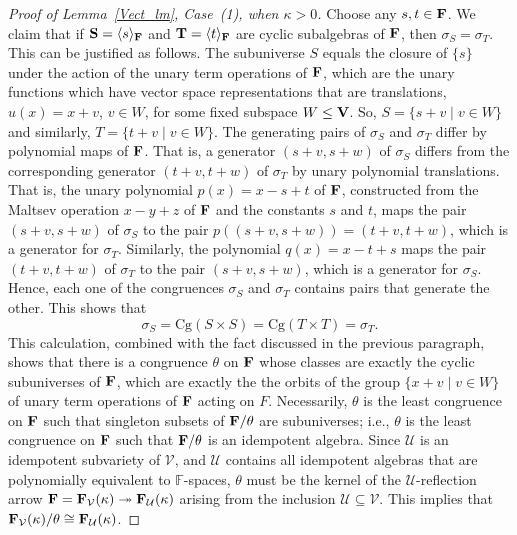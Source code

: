 \documentclass[12pt]{amsart}
\theoremstyle{definition}
\numberwithin{equation}{section}
\newcommand{\m}[1]{{\mathbf{\uppercase{#1}}}}
\newcommand{\cg}{\mathrm{Cg}}
\begin{document}
\begin{proof}[Proof of Lemma~\ref{Vect_lm}, Case~(1), when $\kappa>0$]
Choose any $s, t\in \m f$.
We claim that if
$\m s=\langle s\rangle_{\m f}$ and 
$\m t=\langle t\rangle_{\m f}$ are
cyclic subalgebras of $\m f$, then $\sigma_S=\sigma_T$.
This can be justified as follows.
The subuniverse $S$ equals the closure of $\{s\}$
under the action of the unary term operations
of $\m f$, which are the unary functions which have
vector space representations that are
translations, $u(x)=x+v$,
$v\in W$, for some fixed subspace $W\leq \m v$.
So, $S=\{s+v\;|\;v\in W\}$ and
similarly, $T=\{t+v\;|\;v\in W\}$.
The generating pairs of $\sigma_S$ and $\sigma_T$
differ by polynomial maps of $\m f$.
That is, a generator $(s+v,s+w)$ of $\sigma_S$
differs from the corresponding generator
$(t+v,t+w)$ of $\sigma_T$
by unary polynomial translations.
That is, the unary polynomial
$p(x)=x-s+t$ of $\m f$,
constructed from the Maltsev operation
$x-y+z$ of $\m f$ and the constants $s$ and $t$,
maps the pair $(s+v,s+w)$ of $\sigma_S$
to the pair $p((s+v,s+w))=(t+v,t+w)$,
which is a generator
for $\sigma_T$. Similarly, the polynomial
$q(x)=x-t+s$
maps the pair $(t+v,t+w)$ of $\sigma_T$
to the pair $(s+v,s+w)$, which is a generator
for $\sigma_S$.
Hence, each one of the congruences $\sigma_S$ and $\sigma_T$
contains pairs that generate the other.
This shows that
\[
\sigma_S = \cg(S\times S) = \cg(T\times T)
= \sigma_T.
\]
This calculation, combined with the fact discussed in the previous paragraph,
shows that there is a congruence $\theta$
on $\m f$ whose classes are exactly the cyclic subuniverses
of $\m f$, which are exactly the 
the orbits of the group $\{x+v\;|\;v\in W\}$
of unary term operations of $\m f$ acting on $F$.
Necessarily, $\theta$ is the least congruence on $\m f$
such that singleton subsets of $\m f/\theta$
are subuniverses; i.e., $\theta$ is the least congruence on $\m f$
such that $\m f/\theta$ is an idempotent algebra.
Since $\mathcal{U}$ is an idempotent subvariety of $\mathcal{V}$,
and $\mathcal{U}$ contains all idempotent algebras
that are polynomially equivalent to $\mathbb{F}$-spaces,
$\theta$ must be the kernel of the
$\mathcal{U}$-reflection arrow
$\m f=\m f_{\mathcal{V}}(\kappa)\twoheadrightarrow\m f_{\mathcal{U}}(\kappa)$
arising from
the inclusion $\mathcal{U}\subseteq \mathcal{V}$. This implies
that $\m f_{\mathcal{V}}(\kappa)/\theta\cong \m f_{\mathcal{U}}(\kappa)$.


\end{proof}
\end{document}
